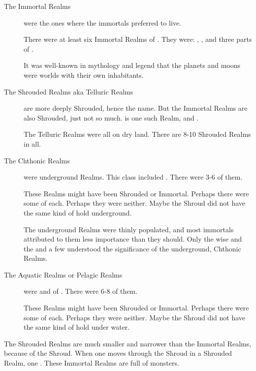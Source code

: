\begin{description}
  \item[The Immortal Realms] 
    were the ones where the immortals preferred to live. 
    
    There were at least six Immortal Realms of \Miith. 
    They were: 
    , ,  and three parts of .
    
    It was well-known in mythology and legend that the planets and moons were worlds with their own inhabitants. 
    
  \item[The Shrouded Realms \textnormal{aka} Telluric Realms]
    are more deeply Shrouded, hence the name. 
    But the Immortal Realms are also Shrouded, just not so much. 
     is one such Realm, and . 
    
    The Telluric Realms were all on dry land. 
    There are 8-10 Shrouded Realms in all. 
  
  \item[The Chthonic Realms] 
    were underground Realms. 
    This class included . 
    There were 3-6 of them. 
    
    These Realms might have been Shrouded or Immortal. 
    Perhaps there were some of each. 
    Perhaps they were neither. 
    Maybe the Shroud did not have the same kind of hold underground. 
  
    The underground Realms were thinly populated, and most immortals attributed to them less importance than they should.
    Only the wise \dragons and the \banelords and a few \resphain understood the significance of the underground, Chthonic Realms.

  \item[The Aquatic Realms \textnormal{or} Pelagic Realms] 
    were  and of . 
    There were 6-8 of them. 
    
    These Realms might have been Shrouded or Immortal. 
    Perhaps there were some of each. 
    Perhaps they were neither. 
    Maybe the Shroud did not have the same kind of hold under water.
\end{description}

The Shrouded Realms are much smaller and narrower than the Immortal Realms, because of the Shroud. 
When one moves  through the Shroud in a Shrouded Realm, one . 
These Immortal Realms are full of monsters. 











